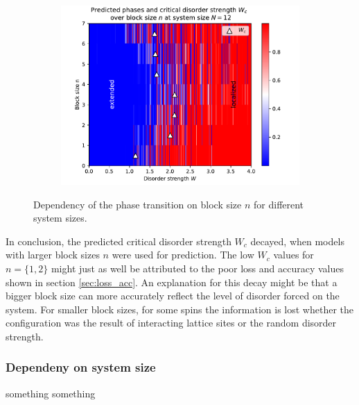 \documentclass[reprint,amsmath,amssymb,aps,prb]{revtex4-2}
\begin{document}
\begin{center}
\begin{figure}[H]
\begin{subfigure}[c]{0.45\textwidth}
			\includegraphics[width=\textwidth]{../results/Wc/N12_Wc_n_dependency.pdf}
		\end{subfigure}
		\caption{Dependency of the phase transition on block size $n$ for different system sizes.}
		\label{fig:wcextractn}
	\end{figure}
\end{center}
\twocolumngrid

In conclusion, the predicted critical disorder strength $W_c$ decayed, when models with larger block sizes $n$ were used for prediction. The low $W_c$ values for $n=\{1,2\}$ might just as well be attributed to the poor loss and accuracy values shown in section \ref{sec:loss_acc}. An explanation for this decay might be that a bigger block size can more accurately reflect the level of disorder forced on the system. For smaller block sizes, for some spins the information is lost whether the configuration was the result of interacting lattice sites or the random disorder strength.

\subsubsection{Dependeny on system size}

something something%
\end{document}
